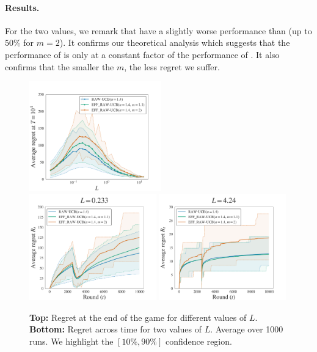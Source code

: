 \paragraph{Results.} For the two values, we remark that \EFFRAW have a slightly worse performance than \RAWUCB (up to $50\%$ for $m=2$). It confirms our theoretical analysis which suggests that the performance of \EFFRAW is only at a constant factor of the performance of \RAWUCB. It also confirms that the smaller the $m$, the less regret we suffer. 
\begin{figure}[!ht]
\centering
\includegraphics[clip, width= 0.51\textwidth]{2.1Rested/fig/fig1A_eff.pdf}
\includegraphics[clip, width= 0.49\textwidth]{2.1Rested/fig/fig1B_eff.pdf}
\includegraphics[clip, width= 0.49\textwidth]{2.1Rested/fig/fig1C_eff.pdf}
\caption{\textbf{Top:} Regret at the end of the game for different values of $L$. \textbf{Bottom:} Regret across time for two values of $L$. Average over 1000 runs. We highlight the $\left[10\%, 90\%\right]$ confidence region.}
\label{fig:rested-eff1}
\end{figure}


